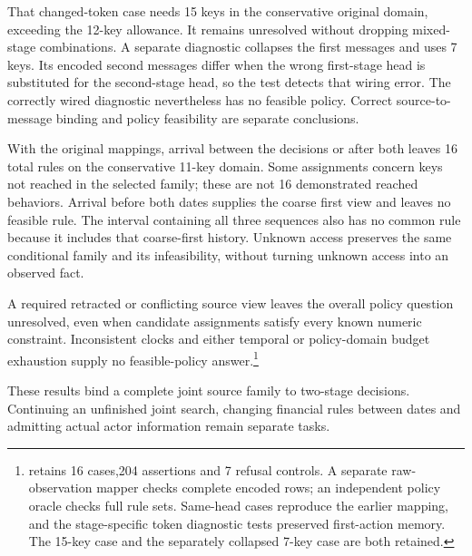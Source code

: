 That changed-token case needs 15 keys in the conservative original domain, exceeding the 12-key allowance. It remains unresolved without dropping mixed-stage combinations. A separate diagnostic collapses the first messages and uses 7 keys. Its encoded second messages differ when the wrong first-stage head is substituted for the second-stage head, so the test detects that wiring error. The correctly wired diagnostic nevertheless has no feasible policy. Correct source-to-message binding and policy feasibility are separate conclusions.

With the original mappings, arrival between the decisions or after both leaves 16 total rules on the conservative 11-key domain. Some assignments concern keys not reached in the selected family; these are not 16 demonstrated reached behaviors. Arrival before both dates supplies the coarse first view and leaves no feasible rule. The interval containing all three sequences also has no common rule because it includes that coarse-first history. Unknown access preserves the same conditional family and its infeasibility, without turning unknown access into an observed fact.

A required retracted or conflicting source view leaves the overall policy question unresolved, even when candidate assignments satisfy every known numeric constraint. Inconsistent clocks and either temporal or policy-domain budget exhaustion supply no feasible-policy answer.\footnote{ retains 16 cases,204 assertions and 7 refusal controls. A separate raw-observation mapper checks complete encoded rows; an independent policy oracle checks full rule sets. Same-head cases reproduce the earlier mapping, and the stage-specific token diagnostic tests preserved first-action memory. The 15-key case and the separately collapsed 7-key case are both retained.}

These results bind a complete joint source family to two-stage decisions. Continuing an unfinished joint search, changing financial rules between dates and admitting actual actor information remain separate tasks.

